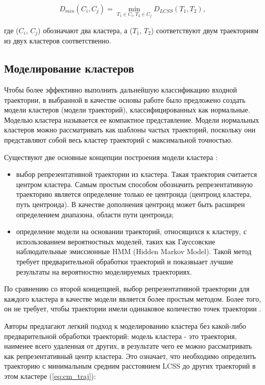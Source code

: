 \begin{equation} \label{eq:single_link}
D_{min}(C_i, C_j) = \min_{T_1 \in C_i, T_2 \in C_j} D_{LCSS}(T_1, T_2),
\end{equation} 

где ($C_i$, $C_j$) обозначают два кластера, а ($T_1$, $T_2$) соответствуют двум траекториям из двух кластеров соответственно.

\subsection{Моделирование кластеров}

Чтобы более эффективно выполнить дальнейшую классификацию входной траектории, в выбранной в качестве основы работе было предложено создать модели кластеров (модели траекторий), классифицированных как нормальные. Моделью кластера называется ее компактное представление. Модели нормальных кластеров можно рассматривать как шаблоны частых траекторий, поскольку они представляют собой весь кластер траекторий с максимальной точностью.

Существуют две основные концепции построения модели кластера \cite{article:surv_cl_models}:
\begin{itemize}
	\item выбор репрезентативной траектории из кластера. Такая траектория считается центром кластера. Самым простым способом обозначить репрезентативную траекторию является определение только ее центроида (центроид кластера, путь центроида). В качестве дополнения центроид может быть расширен определением диапазона, области пути центроида;
	\item определение модели на основании траекторий, относящихся к кластеру, с использованием вероятностных моделей, таких как Гауссовские наблюдательные эмиссионные HMM (Hidden Markov Model). Такой метод требует предварительной обработки траекторий и показвыает лучшие результаты на вероятностно моделируемых траекториях.
\end{itemize}

По сравнению со второй концепцией, выбор репрезентативной траектории для каждого кластера в качестве модели является более простым методом. Более того, он не требует, чтобы траектории имели одинаковое количество точек траектории \cite{inproceedings:7_related_work}.

Авторы \cite{inproceedings:7_related_work} предлагают легкий подход к моделированию кластера без какой-либо предварительной обработки траекторий: модель кластера - это траектория, наименее всего удаленная от других, в результате чего ее можно рассматривать как репрезентативный центр кластера. Это означает, что необходимо определить траекторию с минимальным средним расстоянием LCSS до других траекторий в этом кластере (\ref{eq:cm_traj}):

